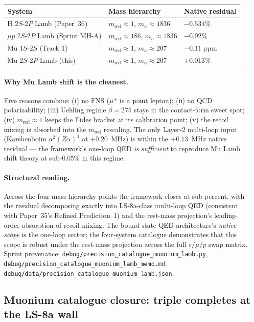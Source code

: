 \documentclass[11pt]{article}
\begin{document}
\begin{tabular}{lll}
\toprule
System & Mass hierarchy & Native residual \\
\midrule
H 2$S$-2$P$ Lamb (Paper~36) & $m_\text{red} \approx 1$, $m_n \approx 1836$ &
$-0.534\%$ \\
$\mu p$ 2$S$-2$P$ Lamb (Sprint MH-A) &
$m_\text{red} \approx 186$, $m_n \approx 1836$ & $-0.92\%$ \\
Mu 1$S$-2$S$ (Track 1) & $m_\text{red} \approx 1$, $m_n \approx 207$ &
$-0.11$ ppm \\
Mu 2$S$-2$P$ Lamb (this) & $m_\text{red} \approx 1$, $m_n \approx 207$ &
$\mathbf{+0.013\%}$ \\
\bottomrule
\end{tabular}

\paragraph{Why Mu Lamb shift is the cleanest.}  Five reasons combine:
(i) no FNS ($\mu^+$ is a point lepton); (ii) no QCD polarizability;
(iii) Uehling regime $\beta = 275$ stays in the contact-form sweet
spot; (iv) $m_\text{red} \approx 1$ keeps the Eides bracket at its
calibration point; (v) the recoil mixing is absorbed into the
$m_\text{red}$ rescaling.  The only Layer-2 multi-loop input
(Karshenboim $\alpha^2(Z\alpha)^4$ at $+0.20$~MHz) is within the
$+0.13$~MHz native residual --- the framework's one-loop QED
\emph{is sufficient} to reproduce Mu Lamb shift theory at sub-$0.05\%$
in this regime.

\paragraph{Structural reading.}  Across the four mass-hierarchy points
the framework closes at sub-percent, with the residual decomposing
exactly into LS-8a-class multi-loop QED (consistent with Paper~35's
Refined Prediction~1) and the rest-mass projection's leading-order
absorption of recoil-mixing.  The bound-state QED architecture's
\emph{native scope} is the one-loop sector; the four-system catalogue
demonstrates that this scope is robust under the rest-mass projection
across the full $e/\mu/p$ swap matrix.  Sprint provenance:
\texttt{debug/precision\_catalogue\_muonium\_lamb.py},
\texttt{debug/precision\_catalogue\_muonium\_lamb\_memo.md},
\texttt{debug/data/precision\_catalogue\_muonium\_lamb.json}.

\subsection{Muonium catalogue closure: triple completes at the LS-8a wall}
\label{sec:muonium_triple_closure}
\end{document}
